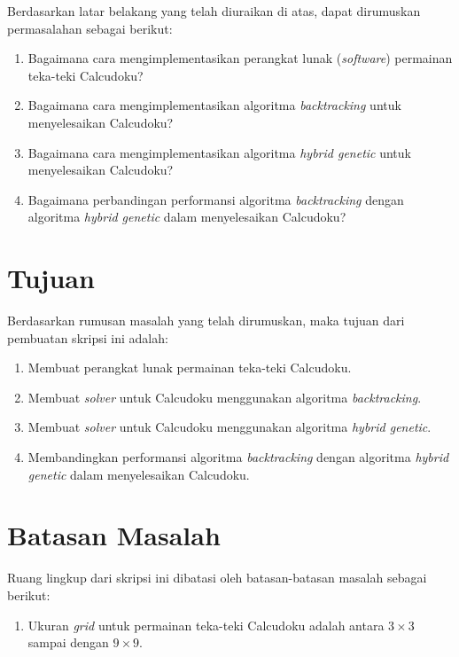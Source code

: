 Berdasarkan latar belakang yang telah diuraikan di atas, dapat dirumuskan permasalahan sebagai berikut:
\begin{enumerate}
\item Bagaimana cara mengimplementasikan perangkat lunak (\textit{software}) permainan teka-teki Calcudoku?
\item Bagaimana cara mengimplementasikan algoritma \textit{backtracking} untuk menyelesaikan Calcudoku?
\item Bagaimana cara mengimplementasikan algoritma \textit{hybrid genetic} untuk menyelesaikan Calcudoku?
\item Bagaimana perbandingan performansi algoritma \textit{backtracking} dengan algoritma \textit{hybrid genetic} dalam menyelesaikan Calcudoku?
\end{enumerate}

\section{Tujuan}
\label{sec:tujuan}

Berdasarkan rumusan masalah yang telah dirumuskan, maka tujuan dari pembuatan skripsi ini adalah:
\begin{enumerate}
\item Membuat perangkat lunak permainan teka-teki Calcudoku.
\item Membuat \textit{solver} untuk Calcudoku menggunakan algoritma \textit{backtracking}.
\item Membuat \textit{solver} untuk Calcudoku menggunakan algoritma \textit{hybrid genetic}.
\item Membandingkan performansi algoritma \textit{backtracking} dengan algoritma \textit{hybrid genetic} dalam menyelesaikan Calcudoku.
\end{enumerate}

\section{Batasan Masalah}
\label{sec:batasanmasalah}
Ruang lingkup dari skripsi ini dibatasi oleh batasan-batasan masalah sebagai berikut:
\begin{enumerate}
\item Ukuran \textit{grid} untuk permainan teka-teki Calcudoku adalah antara \begin{math}3 \times 3\end{math} sampai dengan \begin{math}9 \times 9\end{math}.
\end{enumerate}

